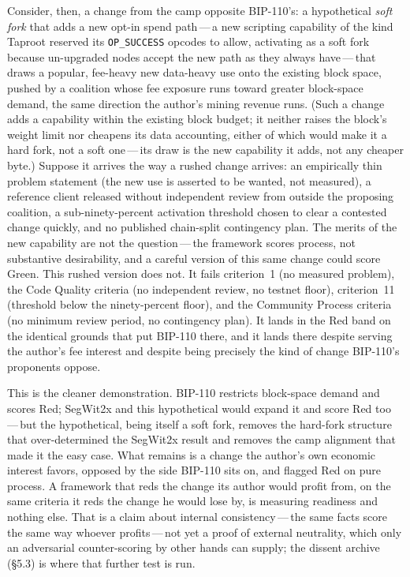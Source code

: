 \documentclass[11pt, twoside, openright]{book}
\newcommand{\sect}[1]{\S#1}
\begin{document}
Consider, then, a change from the camp opposite BIP-110's: a hypothetical \textit{soft fork} that adds a new opt-in spend path\,---\,a new scripting capability of the kind Taproot reserved its \texttt{OP\_SUCCESS} opcodes to allow, activating as a soft fork because un-upgraded nodes accept the new path as they always have\,---\,that draws a popular, fee-heavy new data-heavy use onto the existing block space, pushed by a coalition whose fee exposure runs toward greater block-space demand, the same direction the author's mining revenue runs. (Such a change adds a capability within the existing block budget; it neither raises the block's weight limit nor cheapens its data accounting, either of which would make it a hard fork, not a soft one\,---\,its draw is the new capability it adds, not any cheaper byte.) Suppose it arrives the way a rushed change arrives: an empirically thin problem statement (the new use is asserted to be wanted, not measured), a reference client released without independent review from outside the proposing coalition, a sub-ninety-percent activation threshold chosen to clear a contested change quickly, and no published chain-split contingency plan. The merits of the new capability are not the question\,---\,the framework scores process, not substantive desirability, and a careful version of this same change could score Green. This rushed version does not. It fails criterion~1 (no measured problem), the Code Quality criteria (no independent review, no testnet floor), criterion~11 (threshold below the ninety-percent floor), and the Community Process criteria (no minimum review period, no contingency plan). It lands in the Red band on the identical grounds that put BIP-110 there, and it lands there despite serving the author's fee interest and despite being precisely the kind of change BIP-110's proponents oppose.

This is the cleaner demonstration. BIP-110 restricts block-space demand and scores Red; SegWit2x and this hypothetical would expand it and score Red too\,---\,but the hypothetical, being itself a soft fork, removes the hard-fork structure that over-determined the SegWit2x result and removes the camp alignment that made it the easy case. What remains is a change the author's own economic interest favors, opposed by the side BIP-110 sits on, and flagged Red on pure process. A framework that reds the change its author would profit from, on the same criteria it reds the change he would lose by, is measuring readiness and nothing else. That is a claim about internal consistency\,---\,the same facts score the same way whoever profits\,---\,not yet a proof of external neutrality, which only an adversarial counter-scoring by other hands can supply; the dissent archive (\sect{5.3}) is where that further test is run.
\end{document}
